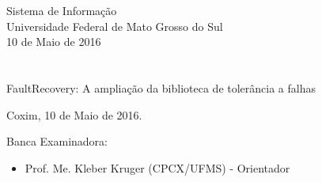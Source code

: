 \vskip 0.5cm
\begin{center}
Sistema de Informação\\
Universidade Federal de Mato Grosso do Sul\\
10 de Maio de 2016
\end{center}
		

\chapter*{}

\begin{center}

\begin{minipage}[t]{10cm}
	\begin{center}
		\vspace{-2cm}
		{{\Large FaultRecovery: A ampliação da biblioteca de tolerância a falhas}}  
	\end{center}
\end{minipage}

\end{center}


\begin{flushright}
	\vspace{12cm}
	Coxim, 10 de Maio de 2016.
	
\end{flushright}

\vspace{2cm}
Banca Examinadora:

\begin{itemize}
	\item Prof. Me. Kleber Kruger (CPCX/UFMS) - Orientador
	
\end{itemize}
